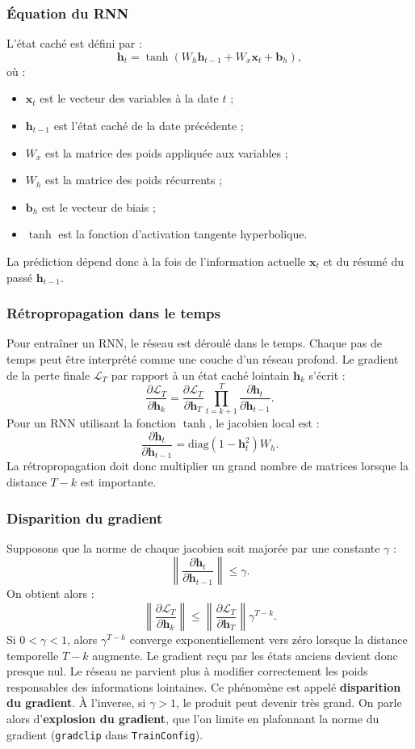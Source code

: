 \documentclass[11pt,a4paper]{article}
\renewcommand{\_}{\usorig\allowbreak}   %
\newcommand{\f}[1]{\texttt{#1}}        %
\begin{document}
\subsubsection{Équation du RNN}
L'état caché est défini par :
\[
  \bm h_t = \tanh\left(W_h\bm h_{t-1} + W_x\bm x_t + \bm b_h\right),
\]
où :
\begin{itemize}[nosep,label=---]
  \item $\bm x_t$ est le vecteur des variables à la date $t$ ;
  \item $\bm h_{t-1}$ est l'état caché de la date précédente ;
  \item $W_x$ est la matrice des poids appliquée aux variables ;
  \item $W_h$ est la matrice des poids récurrents ;
  \item $\bm b_h$ est le vecteur de biais ;
  \item $\tanh$ est la fonction d'activation tangente hyperbolique.
\end{itemize}
La prédiction dépend donc à la fois de l'information actuelle $\bm x_t$ et du résumé du
passé $\bm h_{t-1}$.

\subsubsection{Rétropropagation dans le temps}
Pour entraîner un RNN, le réseau est déroulé dans le temps. Chaque pas de temps peut être
interprété comme une couche d'un réseau profond. Le gradient de la perte finale
$\mathcal L_T$ par rapport à un état caché lointain $\bm h_k$ s'écrit :
\[
  \frac{\partial\mathcal L_T}{\partial\bm h_k} = \frac{\partial\mathcal L_T}{\partial\bm h_T}
  \prod_{t=k+1}^{T}\frac{\partial\bm h_t}{\partial\bm h_{t-1}}.
\]
Pour un RNN utilisant la fonction $\tanh$, le jacobien local est :
\[
  \frac{\partial\bm h_t}{\partial\bm h_{t-1}} = \mathrm{diag}\left(1-\bm h_t^2\right)W_h.
\]
La rétropropagation doit donc multiplier un grand nombre de matrices lorsque la distance
$T-k$ est importante.

\subsubsection{Disparition du gradient}
Supposons que la norme de chaque jacobien soit majorée par une constante $\gamma$ :
\[
  \left\|\frac{\partial\bm h_t}{\partial\bm h_{t-1}}\right\| \le \gamma.
\]
On obtient alors :
\[
  \left\|\frac{\partial\mathcal L_T}{\partial\bm h_k}\right\| \le
  \left\|\frac{\partial\mathcal L_T}{\partial\bm h_T}\right\|\gamma^{T-k}.
\]
Si $0<\gamma<1$, alors $\gamma^{T-k}$ converge exponentiellement vers zéro lorsque la
distance temporelle $T-k$ augmente. Le gradient reçu par les états anciens devient donc
presque nul. Le réseau ne parvient plus à modifier correctement les poids responsables des
informations lointaines. Ce phénomène est appelé \textbf{disparition du gradient}. À
l'inverse, si $\gamma>1$, le produit peut devenir très grand. On parle alors
d'\textbf{explosion du gradient}, que l'on limite en plafonnant la norme du gradient
(\f{grad\_clip} dans \f{TrainConfig}).
\end{document}

